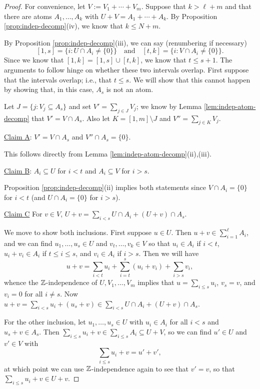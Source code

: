 \begin{proof}
For convenience, let $V := V_1 + \cdots + V_m$.
Suppose that $k > \ell + m$ and that there are atoms $A_1,\dots,A_k$ with $U+V = A_1 + \cdots + A_k$.
By Proposition \ref{prop:indep-decomp}(iv), we know that $k \le N+m$.

By Proposition \ref{prop:indep-decomp}(iii), we can say (renumbering if necessary)
\[ [ 1,s ] =  \{ i: U\cap A_i \neq\{0\}\} \quad \textrm{and} \quad [ t,k ] = \{i: V\cap A_i \neq \{0\}\}. \]
Since we know that $[ 1,k ] = [ 1,s ] \cup [ t,k ]$, we know that $t \le s+1$.
The arguments to follow hinge on whether these two intervals overlap.  
First suppose that the intervals overlap; i.e., that $t \le s$.
We will show that this cannot happen by showing that, in this case, $A_s$ is not an atom.

Let $J = \{ j: V_j \subseteq A_s \}$ and set $V' = \sum_{j\in J} V_j$; we know by Lemma \ref{lem:indep-atom-decomp} that $V' = V \cap A_s$.
Also let $K = [ 1,m ] \setminus J$ and $V'' = \sum_{j\in K} V_j$.

\noindent\underline{Claim A}: $V' = V\cap A_s$ and $V'' \cap A_s = \{0\}$. \label{cla}

This follows directly from Lemma \ref{lem:indep-atom-decomp}(ii),(iii).

\noindent\underline{Claim B}: $A_i \subseteq U$ for $i<t$ and $A_i \subseteq V$ for $i > s$. \label{clb}

Proposition \ref{prop:indep-decomp}(ii) implies both statements since $V \cap A_i = \{0\}$ for $i<t$ (and $U\cap A_i = \{0\}$ for $i>s$).

\noindent\underline{Claim C} For $v\in V$, $U+v = \sum\limits_{i<s} U\cap A_i + (U+v)\cap A_s$. \label{clc}

We move to show both inclusions.
First suppose $u\in U$. 
Then $u+v \in \sum_{i=1}^\ell A_i$, and we can find $u_1,\dots, u_s\in U$ and $v_t,\dots, v_k\in V$ so that
$u_i\in A_i$ if $i < t$, $u_i + v_i \in A_i$ if $t\le i \le s$, and $v_i \in A_i$ if $i > s$.
Then we will have
\[u+v = \sum_{i<t} u_i + \sum_{i=t}^{s} (u_i+v_i) + \sum_{i > s} v_i, \]
whence the $\mathbb{Z}$-independence of $U,V_1,\dots,V_m$ implies that $u = \sum_{i\le s} u_i$, $v_s = v$, and $v_i = 0$ for all $i\neq s$.
Now $u+v = \sum_{i<s} u_i + (u_s+v)\in \sum_{i<s} U\cap A_i + (U+v)\cap A_s$.

For the other inclusion, let $u_1,\dots, u_s\in U$ with $u_i\in A_i$ for all $i<s$ and $u_s + v\in A_s$.
Then $\sum_{i\le s} u_i +v \in \sum_{i\le s} A_i \subseteq U+V$, so we can find $u'\in U$ and $v'\in V$ with 
\[\sum_{i\le s}u_i + v = u' + v',\]
at which point we can use $\mathbb{Z}$-independence again to see that $v' = v$, so that $\sum_{i\le s} u_i + v\in U+v$.


\end{proof}

